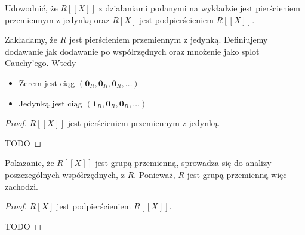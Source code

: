 \begin{problem}[2]
	Udowodnić, że $R\left[ \left[ X \right]  \right] $ z działaniami podanymi na wykładzie jest pierścieniem przemiennym z jedynką oraz $R\left[ X \right] $ jest podpierścieniem $R\left[ \left[ X \right]  \right] $.
\end{problem} 
\begin{solution}

	Zakładamy, że $R$ jest pierścieniem przemiennym z jedynką. Definiujemy dodawanie jak dodawanie po współrzędnych oraz mnożenie jako splot Cauchy'ego. Wtedy 
	\begin{itemize}
		\item Zerem jest ciąg $\left( \mathbf{0}_{\scriptscriptstyle R}, \mathbf{0}_{\scriptscriptstyle R}, \mathbf{0}_{\scriptscriptstyle R}, \ldots \right) $
		\item Jedynką jest ciąg $\left( \mathbf{1}_{\scriptscriptstyle R}, \mathbf{0}_{\scriptscriptstyle R}, \mathbf{0}_{\scriptscriptstyle R}, \ldots \right) $
	\end{itemize}


	\begin{proof}
		 $R\left[ \left[ X \right]  \right] $ jest pierścieniem przemiennym z jedynką.
		 
		 TODO
	\end{proof} 


	Pokazanie, że $R\left[ \left[ X \right]  \right] $ jest grupą przemienną, sprowadza się do analizy poszczególnych współrzędnych, z $R$. Ponieważ, $R$ jest grupą przemienną więc zachodzi.

	\begin{proof}
		 $R\left[ X \right] $ jest podpierścieniem $R\left[ \left[ X \right]  \right] $.
		 
		 TODO
	\end{proof} 

\end{solution} 

